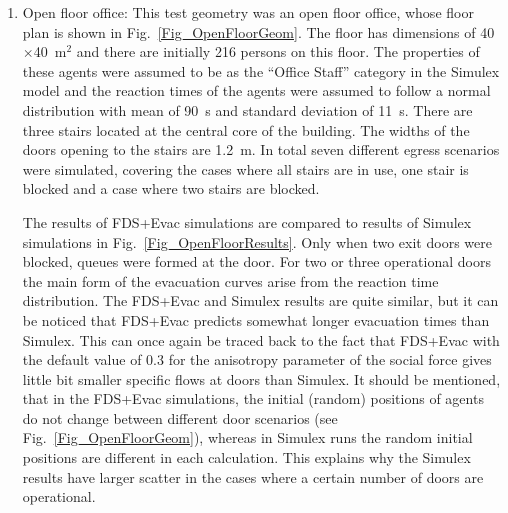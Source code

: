 \documentclass[12pt,a4paper,final,twoside]{stylevk}
\begin{document}
\begin{enumerate}
\item Open floor office: This test geometry was an open floor office,
  whose floor plan is shown in Fig.~\ref{Fig_OpenFloorGeom}.  The
  floor has dimensions of 40$\times$40~$\mathrm{m^2}$ and there are
  initially 216 persons on this floor.  The properties of these agents
  were assumed to be as the ``Office Staff'' category in the Simulex
  model and the reaction times of the agents were assumed to follow a
  normal distribution with mean of 90~s and standard deviation of
  11~s.  There are three stairs located at the central core of the
  building.  The widths of the doors opening to the stairs are 1.2~m.
  In total seven different egress scenarios were simulated, covering
  the cases where all stairs are in use, one stair is blocked and a
  case where two stairs are blocked.
  
  The results of FDS+Evac simulations are compared to results of
  Simulex simulations in Fig.~\ref{Fig_OpenFloorResults}.  Only when
  two exit doors were blocked, queues were formed at the door.  For
  two or three operational doors the main form of the evacuation
  curves arise from the reaction time distribution.  The FDS+Evac and
  Simulex results are quite similar, but it can be noticed that
  FDS+Evac predicts somewhat longer evacuation times than Simulex.
  This can once again be traced back to the fact that FDS+Evac with
  the default value of 0.3 for the anisotropy parameter of the social
  force gives little bit smaller specific flows at doors than Simulex.
  It should be mentioned, that in the FDS+Evac simulations, the
  initial (random) positions of agents do not change between different
  door scenarios (see Fig.~\ref{Fig_OpenFloorGeom}), whereas in
  Simulex runs the random initial positions are different in each
  calculation.  This explains why the Simulex results have larger
  scatter in the cases where a certain number of doors are
  operational.\vspace{\fill}




\end{enumerate}
\end{document}
